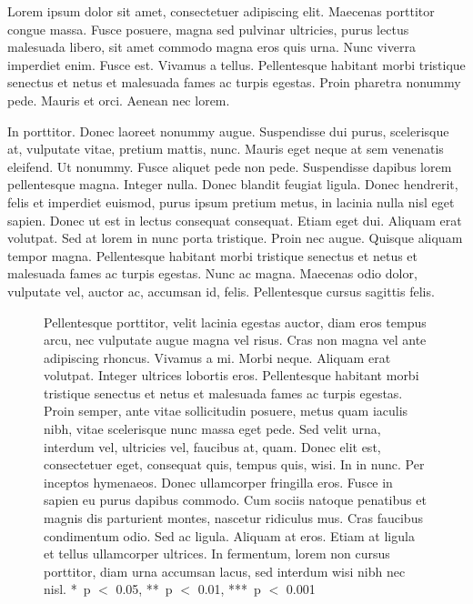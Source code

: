 \documentclass{biorxiv}
\begin{document}
Lorem ipsum dolor sit amet, consectetuer adipiscing elit. Maecenas porttitor
congue massa. Fusce posuere, magna sed pulvinar ultricies, purus lectus
malesuada libero, sit amet commodo magna eros quis urna. Nunc viverra
imperdiet enim. Fusce est. Vivamus a tellus. Pellentesque habitant morbi
tristique senectus et netus et malesuada fames ac turpis egestas. Proin
pharetra nonummy pede. Mauris et orci. Aenean nec lorem.

In porttitor. Donec laoreet nonummy augue. Suspendisse dui purus, scelerisque
at, vulputate vitae, pretium mattis, nunc. Mauris eget neque at sem venenatis
eleifend. Ut nonummy. Fusce aliquet pede non pede. Suspendisse dapibus lorem
pellentesque magna. Integer nulla. Donec blandit feugiat ligula. Donec
hendrerit, felis et imperdiet euismod, purus ipsum pretium metus, in lacinia
nulla nisl eget sapien. Donec ut est in lectus consequat consequat. Etiam eget
dui. Aliquam erat volutpat. Sed at lorem in nunc porta tristique. Proin nec
augue. Quisque aliquam tempor magna. Pellentesque habitant morbi tristique
senectus et netus et malesuada fames ac turpis egestas. Nunc ac magna.
Maecenas odio dolor, vulputate vel, auctor ac, accumsan id, felis.
Pellentesque cursus sagittis felis.

\begin{figure}[t]
  \figureplaceholder{\onecolumnwidth}{69.96mm}%
  \caption{
     Pellentesque porttitor, velit lacinia egestas auctor, diam
    eros tempus arcu, nec vulputate augue magna vel risus. Cras non magna
    vel ante adipiscing rhoncus. Vivamus a mi. Morbi neque. Aliquam erat
    volutpat. Integer ultrices lobortis eros. Pellentesque habitant morbi
    tristique senectus et netus et malesuada fames ac turpis egestas.
     Proin semper, ante vitae sollicitudin posuere, metus quam
    iaculis nibh, vitae scelerisque nunc massa eget pede. Sed velit urna,
    interdum vel, ultricies vel, faucibus at, quam. Donec elit est,
    consectetuer eget, consequat quis, tempus quis, wisi. In in nunc. Per
    inceptos hymenaeos. Donec ullamcorper fringilla eros. Fusce in sapien eu
    purus dapibus commodo. Cum sociis natoque penatibus et magnis dis
    parturient montes, nascetur ridiculus mus. Cras faucibus condimentum
    odio.  Sed ac ligula. Aliquam at eros. Etiam at ligula et
    tellus ullamcorper ultrices. In fermentum, lorem non cursus porttitor,
    diam urna accumsan lacus, sed interdum wisi nibh nec nisl. *~p
    $<$ 0.05, **~p $<$ 0.01, ***~p $<$ 0.001}
  \label{fig:single}
\end{figure}
\end{document}
